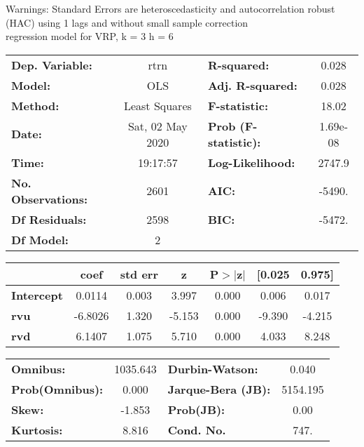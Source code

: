 Warnings: \newline
 [1] Standard Errors are heteroscedasticity and autocorrelation robust (HAC) using 1 lags and without small sample correction\\ 

regression model for VRP, k = 3 h = 6\begin{center}
\begin{tabular}{lclc}
\toprule
\textbf{Dep. Variable:}    &       rtrn       & \textbf{  R-squared:         } &     0.028   \\
\textbf{Model:}            &       OLS        & \textbf{  Adj. R-squared:    } &     0.028   \\
\textbf{Method:}           &  Least Squares   & \textbf{  F-statistic:       } &     18.02   \\
\textbf{Date:}             & Sat, 02 May 2020 & \textbf{  Prob (F-statistic):} &  1.69e-08   \\
\textbf{Time:}             &     19:17:57     & \textbf{  Log-Likelihood:    } &    2747.9   \\
\textbf{No. Observations:} &        2601      & \textbf{  AIC:               } &    -5490.   \\
\textbf{Df Residuals:}     &        2598      & \textbf{  BIC:               } &    -5472.   \\
\textbf{Df Model:}         &           2      & \textbf{                     } &             \\
\bottomrule
\end{tabular}
\begin{tabular}{lcccccc}
                   & \textbf{coef} & \textbf{std err} & \textbf{z} & \textbf{P$> |$z$|$} & \textbf{[0.025} & \textbf{0.975]}  \\
\midrule
\textbf{Intercept} &       0.0114  &        0.003     &     3.997  &         0.000        &        0.006    &        0.017     \\
\textbf{rvu}       &      -6.8026  &        1.320     &    -5.153  &         0.000        &       -9.390    &       -4.215     \\
\textbf{rvd}       &       6.1407  &        1.075     &     5.710  &         0.000        &        4.033    &        8.248     \\
\bottomrule
\end{tabular}
\begin{tabular}{lclc}
\textbf{Omnibus:}       & 1035.643 & \textbf{  Durbin-Watson:     } &    0.040  \\
\textbf{Prob(Omnibus):} &   0.000  & \textbf{  Jarque-Bera (JB):  } & 5154.195  \\
\textbf{Skew:}          &  -1.853  & \textbf{  Prob(JB):          } &     0.00  \\
\textbf{Kurtosis:}      &   8.816  & \textbf{  Cond. No.          } &     747.  \\
\bottomrule
\end{tabular}
\end{center}

